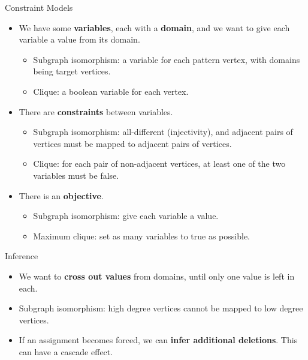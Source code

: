 \documentclass{beamer}
\begin{document}
\begin{frame}{Constraint Models}
    \begin{itemize}
        \item We have some \textbf{variables}, each with a \textbf{domain}, and we want to give each
            variable a value from its domain.
            \begin{itemize}
                \item Subgraph isomorphism: a variable for each pattern vertex, with domains being
                    target vertices.
                \item Clique: a boolean variable for each vertex.
            \end{itemize}
        \item There are \textbf{constraints} between variables.
            \begin{itemize}
                \item Subgraph isomorphism: all-different (injectivity), and adjacent pairs of
                    vertices must be mapped to adjacent pairs of vertices.
                \item Clique: for each pair of non-adjacent vertices, at least one of the two
                    variables must be false.
            \end{itemize}
        \item There is an \textbf{objective}.
            \begin{itemize}
                \item Subgraph isomorphism: give each variable a value.
                \item Maximum clique: set as many variables to true as possible.
            \end{itemize}
    \end{itemize}
\end{frame}

\begin{frame}{Inference}
    \begin{itemize}
        \item We want to \textbf{cross out values} from domains, until only one value is left in
            each.
        \item Subgraph isomorphism: high degree vertices cannot be mapped to low degree vertices.
        \item If an assignment becomes forced, we can \textbf{infer additional deletions}. This can
            have a cascade effect.
    \end{itemize}
\end{frame}
\end{document}
